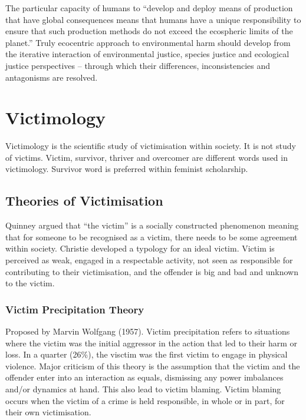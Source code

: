 \documentclass{article}
\begin{document}
The particular capacity of humans to “develop and deploy means of production that have global consequences means that humans have a unique responsibility to ensure that such production methods do not exceed the ecospheric limits of the planet.” Truly ecocentric approach to environmental harm should develop from the iterative interaction of environmental justice, species justice and ecological justice perspectives – through which their differences, inconsistencies and antagonisms are resolved.

\section{Victimology}

Victimology is the scientific study of victimisation within society. It is not study of victims. Victim, survivor, thriver and overcomer are different words used in victimology. Survivor word is preferred within feminist scholarship.

\subsection{Theories of Victimisation}

Quinney argued that “the victim” is a socially constructed phenomenon meaning that for someone to be recognised as a victim, there needs to be some agreement within society. Christie developed a typology for an ideal victim. Victim is perceived as weak, engaged in a respectable activity, not seen as responsible for contributing to their victimisation, and the offender is big and bad and unknown to the victim.

\subsubsection*{Victim Precipitation Theory}

Proposed by Marvin Wolfgang (1957). Victim precipitation refers to situations where the victim was the initial aggressor in the action that led to their harm or loss. In a quarter (26\%), the visctim was the first victim to engage in physical violence. Major criticism of this theory is the assumption that the victim and the offender enter into an interaction as equals, dismissing any power imbalances and/or dynamics at hand. This also lead to victim blaming. Victim blaming occurs when the victim of a crime is held responsible, in whole or in part, for their own victimisation.
\end{document}
